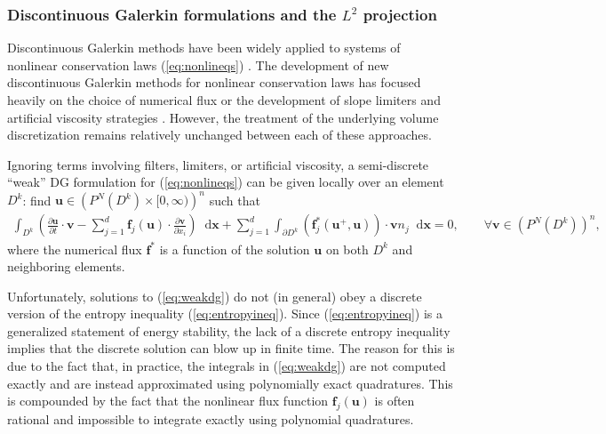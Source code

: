 \documentclass[preprint,10pt]{article}
\theoremstyle{definition}
\theoremstyle{lemma}
\theoremstyle{theorem}
\theoremstyle{assumption}
\newcommand{\pd}[2]{\frac{\partial#1}{\partial#2}}
\newcommand{\LRp}[1]{\left( #1 \right)}
\newcommand*\diff[1]{\mathop{}\!{\mathrm{d}#1}} %
\begin{document}
\subsubsection{Discontinuous Galerkin formulations and the $L^2$ projection}

Discontinuous Galerkin methods have been widely applied to systems of nonlinear conservation laws (\ref{eq:nonlineqs}) \cite{cockburn1989tvb, cockburn1998runge, cockburn2001devising, karniadakis2013spectral}.  The development of new discontinuous Galerkin methods for nonlinear conservation laws has focused heavily on the choice of numerical flux \cite{qiu2006numerical} or the development of  slope limiters \cite{krivodonova2007limiters, zhang2012maximum, dumbser2014posteriori} and artificial viscosity strategies \cite{persson2006sub, barter2010shock, klockner2011viscous}.  However, the treatment of the underlying volume discretization remains relatively unchanged between each of these approaches.  

Ignoring terms involving filters, limiters, or artificial viscosity, a semi-discrete ``weak'' DG formulation  for (\ref{eq:nonlineqs}) can be given locally over an element $D^k$: find $\bm{u}\in \LRp{P^N\LRp{D^k} \times [0,\infty)}^n$ such that
\begin{align}
\int_{D^k} \LRp{\pd{\bm{u}}{t}\cdot \bm{v} - \sum_{j=1}^d\bm{f}_j(\bm{u}) \cdot \pd{\bm{v}}{x_i}} \diff{\bm{x}} 
+ \sum_{j=1}^d \int_{\partial D^k} \LRp{\bm{f}^*_j\LRp{\bm{u}^+,\bm{u}} }\cdot \bm{v} n_j  \diff{\bm{x}} = 0, \qquad \forall \bm{v}\in \LRp{P^N\LRp{D^k}}^n,
\label{eq:weakdg}
\end{align}
where the numerical flux $\bm{f}^*$ is a function of the solution $\bm{u}$ on both $D^k$ and neighboring elements.  

Unfortunately, solutions to (\ref{eq:weakdg}) do not (in general) obey a discrete version of the entropy inequality (\ref{eq:entropyineq}).  Since (\ref{eq:entropyineq}) is a generalized statement of energy stability, the lack of a discrete entropy inequality implies that the discrete solution can blow up in finite time.  The reason for this is due to the fact that, in practice, the integrals in (\ref{eq:weakdg}) are not computed exactly and are instead approximated using polynomially exact quadratures.  This is compounded by the fact that the nonlinear flux function $\bm{f}_j\LRp{\bm{u}}$ is often rational and impossible to integrate exactly using polynomial quadratures.  
\end{document}
